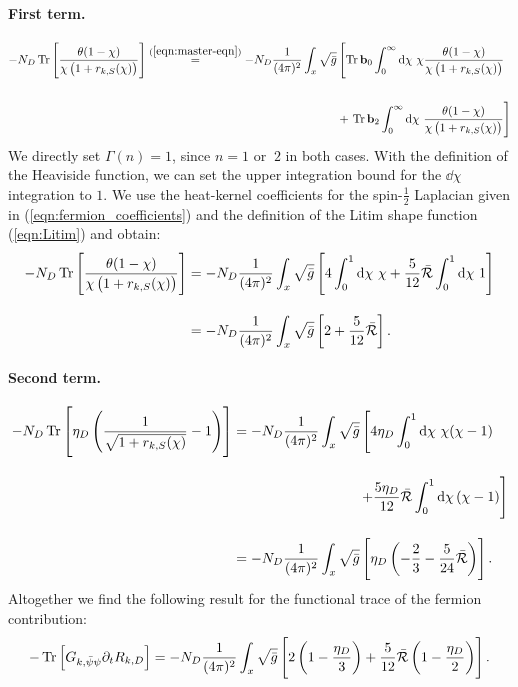 \paragraph{First term.} 
\begin{align}
		-N_D\tr{\frac{\theta(1-\chi)}{\chi\left(1+r_{k,S}(\chi)\right)}} \overset{(\mathrm{\ref{eqn:master-eqn}})}{=} -N_D\frac{1}{(4\pi)^2}\int_x\sqrt{\bar{g}}&\left[\operatorname{Tr}\mathbf{b}_0\int_0^{\infty}\dd\chi\ \chi\frac{\theta(1-\chi)}{\chi\left(1+r_{k,S}(\chi)\right)}\right.\nonumber \\
		\phantom{.}\\
 &+ \left.\operatorname{Tr}\mathbf{b}_2\int_0^{\infty}\dd\chi\ \frac{\theta(1-\chi)}{\chi\left(1+r_{k,S}(\chi)\right)}\right]\nonumber
\end{align}
We directly set $\Gamma(n)=1$, since $n=1$ or $\ 2$ in both cases. With the definition of the Heaviside function, we can set the upper integration bound for the $\dd\chi$ integration to $1$. We use the heat-kernel coefficients for the spin-$\frac{1}{2}$ Laplacian given in (\ref{eqn:fermion_coefficients}) and the definition of the Litim shape function (\ref{eqn:Litim}) and obtain:
\begin{equation}
\begin{aligned}
		-N_D\operatorname{Tr}\left[ \frac{\theta(1-\chi)}{\chi\left(1+r_{k,S}(\chi)\right)} \right] &= -N_D\frac{1}{(4\pi)^2}\int_x\sqrt{\bar{g}}\left[4\int_0^1\dd\chi \ \chi + \frac{5}{12}\bar{\mathcal{R}}\int_0^1\dd\chi\  1\right]\\[10pt]
&= -N_D\frac{1}{(4\pi)^2}\int_x\sqrt{\bar{g}}\left[2 + \frac{5}{12}\bar{\mathcal{R}}\right].
\end{aligned}
\end{equation}
\paragraph{Second term.}
\begin{equation}
\begin{aligned}
	-N_D\operatorname{Tr}\left[ \eta_D\left(\frac{1}{\sqrt{1+r_{k,S}(\chi)}}-1\right) \right] &= -N_D\frac{1}{(4\pi)^2} \int_x\sqrt{\bar{g}}\left[4\eta_D\int_0^1\dd\chi \ \chi(\chi-1)\right. \\[10pt]
 &\left. \qquad\qquad\qquad\qquad\quad+ \frac{5\eta_D}{12}\bar{\mathcal{R}}\int_0^1\dd\chi\left(\chi-1\right)\right]\\[10pt]
	&= -N_D\frac{1}{(4\pi)^2} \int_x\sqrt{\bar{g}} \left[\eta_D\left(-\frac{2}{3} - \frac{5}{24}\bar{\mathcal{R}}\right)\right].
\end{aligned}
\end{equation}
Altogether we find the following result for the functional trace of the fermion contribution:
\begin{equation}
	-\operatorname{Tr}\left[G_{k, \bar{\psi} \psi} \partial_{t} R_{k, D}\right]= -N_D\frac{1}{(4\pi)^2}\int_x\sqrt{\bar{g}}\left[2\left(1-\frac{\eta_D}{3}\right) + \frac{5}{12}\bar{\mathcal{R}}\left(1-\frac{\eta_D}{2}\right)\right].
	\label{eqn:trace_fermions}
\end{equation}
\vfill
